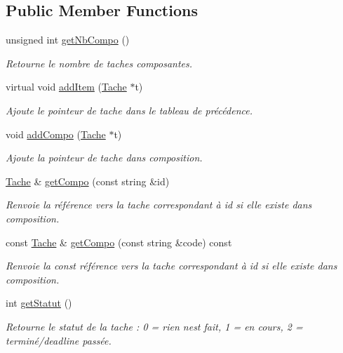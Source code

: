 \subsection*{Public Member Functions}
\begin{DoxyCompactItemize}
\item 
unsigned int \hyperlink{class_composite_a8f2329eb1c8e193a820243948b9a9cf7}{get\+Nb\+Compo} ()
\begin{DoxyCompactList}\small\item\em Retourne le nombre de taches composantes. \end{DoxyCompactList}\item 
virtual void \hyperlink{class_composite_ab0d63970716648141fbc24e7d77815a2}{add\+Item} (\hyperlink{class_tache}{Tache} $\ast$t)
\begin{DoxyCompactList}\small\item\em Ajoute le pointeur de tache dans le tableau de précédence. \end{DoxyCompactList}\item 
void \hyperlink{class_composite_ad8dce9e36cfb7386331babc980c382ff}{add\+Compo} (\hyperlink{class_tache}{Tache} $\ast$t)
\begin{DoxyCompactList}\small\item\em Ajoute la pointeur de tache dans composition. \end{DoxyCompactList}\item 
\hyperlink{class_tache}{Tache} \& \hyperlink{class_composite_af4ed8de948b2e2ffbd5a190aa1bc5260}{get\+Compo} (const string \&id)
\begin{DoxyCompactList}\small\item\em Renvoie la référence vers la tache correspondant à id si elle existe dans composition. \end{DoxyCompactList}\item 
const \hyperlink{class_tache}{Tache} \& \hyperlink{class_composite_a490a29347d32a8916f6a636e6de6d1ed}{get\+Compo} (const string \&code) const 
\begin{DoxyCompactList}\small\item\em Renvoie la const référence vers la tache correspondant à id si elle existe dans composition. \end{DoxyCompactList}\item 
int \hyperlink{class_composite_a6def8410e8a78678b488d1610266ee5b}{get\+Statut} ()
\begin{DoxyCompactList}\small\item\em Retourne le statut de la tache \+: 0 = rien n\textquotesingle{}est fait, 1 = en cours, 2 = terminé/deadline passée. \end{DoxyCompactList}\item 

\end{DoxyCompactItemize}
